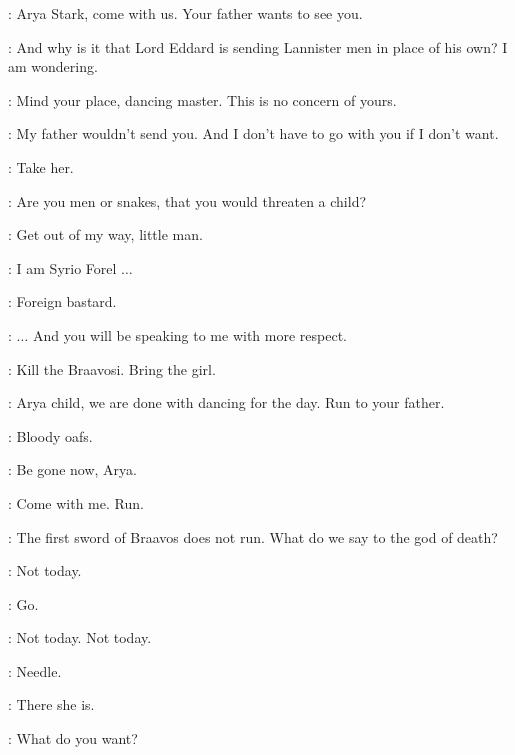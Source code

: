 \MERYN: Arya Stark, come with us. Your father wants to see you. 

\SYRIO: And why is it that Lord Eddard is sending Lannister men in place of his own? I am wondering. 

\MERYN: Mind your place, dancing master. This is no concern of yours. 

\ARYA: My father wouldn't send you. And I don't have to go with you if I don't want. 

\MERYN: Take her. 

\SYRIO: Are you men or snakes, that you would threaten a child? 

\MERYN: Get out of my way, little man. 

\SYRIO: I am Syrio Forel $\ldots$ 

\MERYN: Foreign bastard. 

\SYRIO: $\ldots$ And you will be speaking to me with more respect. 

\MERYN: Kill the Braavosi. Bring the girl. 

\SYRIO: Arya child, we are done with dancing for the day. Run to your father. 


\MERYN: Bloody oafs. 

\SYRIO: Be gone now, Arya. 

\ARYA: Come with me. Run. 

\SYRIO: The first sword of Braavos does not run.  What do we say to the god of death? 

\ARYA: Not today. 

\SYRIO: Go. 



\ARYA: Not today. Not today. 


\ARYA: Needle. 


\BOY: There she is. 

\ARYA: What do you want? 


